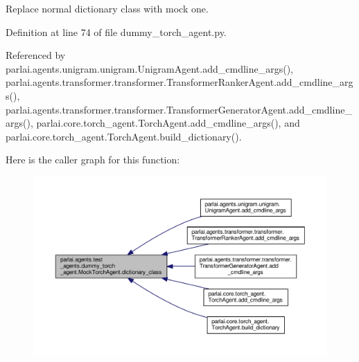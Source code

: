 \begin{DoxyVerb}Replace normal dictionary class with mock one.\end{DoxyVerb}
 

Definition at line 74 of file dummy\+\_\+torch\+\_\+agent.\+py.



Referenced by parlai.\+agents.\+unigram.\+unigram.\+Unigram\+Agent.\+add\+\_\+cmdline\+\_\+args(), parlai.\+agents.\+transformer.\+transformer.\+Transformer\+Ranker\+Agent.\+add\+\_\+cmdline\+\_\+args(), parlai.\+agents.\+transformer.\+transformer.\+Transformer\+Generator\+Agent.\+add\+\_\+cmdline\+\_\+args(), parlai.\+core.\+torch\+\_\+agent.\+Torch\+Agent.\+add\+\_\+cmdline\+\_\+args(), and parlai.\+core.\+torch\+\_\+agent.\+Torch\+Agent.\+build\+\_\+dictionary().

Here is the caller graph for this function\+:
\nopagebreak
\begin{figure}[H]
\begin{center}
\leavevmode
\includegraphics[width=350pt]{classparlai_1_1agents_1_1test__agents_1_1dummy__torch__agent_1_1MockTorchAgent_a122bde825e09b1450578a7ab7d606bfd_icgraph}
\end{center}
\end{figure}
\mbox{\label{classparlai_1_1agents_1_1test__agents_1_1dummy__torch__agent_1_1MockTorchAgent_aea8dfe6e44a419f31e741c4770a82f9b}} 
